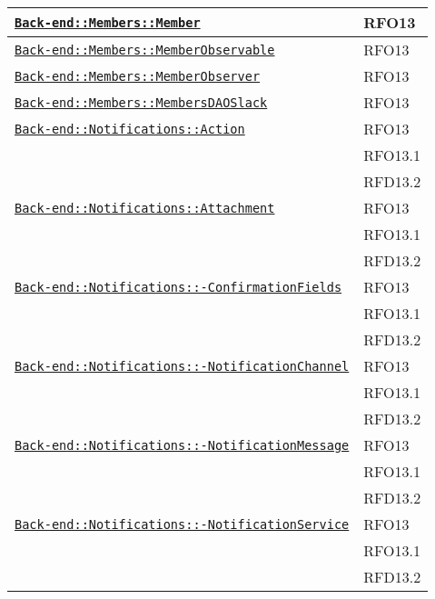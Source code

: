 \begin{longtable}{|>{\centering}m{10cm}|m{3cm}<{\centering}|}
\hyperref[Back-end::Members::Member]{\texttt{Back-end::Members::Member}} & RFO13\\ \hline

\hyperref[Back-end::Members::MemberObservable]{\texttt{Back-end::Members::MemberObservable}} & RFO13\\ \hline

\hyperref[Back-end::Members::MemberObserver]{\texttt{Back-end::Members::MemberObserver}} & RFO13\\ \hline

\hyperref[Back-end::Members::MembersDAOSlack]{\texttt{Back-end::Members::MembersDAOSlack}} & RFO13\\ \hline

\hyperref[Back-end::Notifications::Action]{\texttt{Back-end::Notifications::Action}} & RFO13\\
& RFO13.1\\
& RFD13.2\\ \hline

\hyperref[Back-end::Notifications::Attachment]{\texttt{Back-end::Notifications::Attachment}} & RFO13\\
& RFO13.1\\
& RFD13.2\\ \hline

\hyperref[Back-end::Notifications::ConfirmationFields]{\texttt{Back-end::Notifications::-\linebreak ConfirmationFields}} & RFO13\\
& RFO13.1\\
& RFD13.2\\ \hline

\hyperref[Back-end::Notifications::NotificationChannel]{\texttt{Back-end::Notifications::-\linebreak NotificationChannel}} & RFO13\\
& RFO13.1\\
& RFD13.2\\ \hline

\hyperref[Back-end::Notifications::NotificationMessage]{\texttt{Back-end::Notifications::-\linebreak NotificationMessage}} & RFO13\\
& RFO13.1\\
& RFD13.2\\ \hline

\hyperref[Back-end::Notifications::NotificationService]{\texttt{Back-end::Notifications::-\linebreak NotificationService}} & RFO13\\
& RFO13.1\\
& RFD13.2\\ \hline


\end{longtable}
